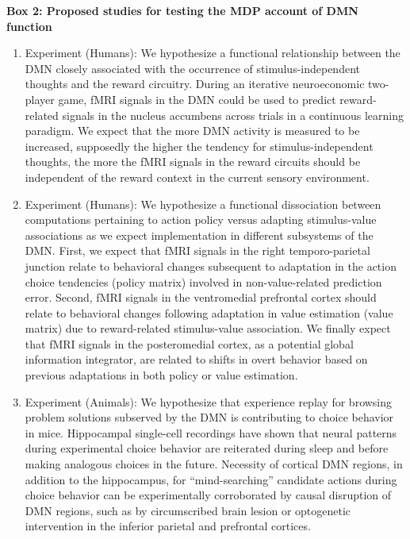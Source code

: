 \documentclass[10pt,letterpaper]{article}
\begin{document}
\begin{mdframed}
  \vspace{1em}
  \textbf{Box 2: Proposed studies for testing the MDP account of DMN function}
\begin{enumerate}
\item Experiment (Humans): We hypothesize a functional relationship between the DMN closely associated with the occurrence of stimulus-independent thoughts and the reward circuitry. During an iterative neuroeconomic two-player game, fMRI signals in the DMN could be used to predict reward-related signals in the nucleus accumbens across trials in a continuous learning paradigm. We expect that the more DMN activity is measured to be increased, supposedly the higher the tendency for stimulus-independent thoughts, the more the fMRI signals in the reward circuits should be independent of the reward context in the current sensory environment.

\item Experiment (Humans): We hypothesize a functional dissociation between computations pertaining to action policy versus adapting stimulus-value associations as we expect implementation in different subsystems of the DMN. First, we expect that fMRI signals in the right temporo-parietal junction relate to behavioral changes subsequent to adaptation in the action choice tendencies (policy matrix) involved in non-value-related prediction error. Second, fMRI signals in the ventromedial prefrontal cortex should relate to behavioral changes following adaptation in value estimation (value matrix) due to reward-related stimulus-value association. We finally expect that fMRI signals in the posteromedial cortex, as a potential global information integrator, are related to shifts in overt behavior based on previous adaptations in both policy or value estimation.

\item Experiment (Animals): We hypothesize that experience replay for browsing problem solutions subserved by the DMN is contributing to choice behavior in mice. Hippocampal single-cell recordings have shown that neural patterns during experimental choice behavior are reiterated during sleep and before making analogous choices in the future. Necessity of cortical DMN regions, in addition to the hippocampus, for “mind-searching” candidate actions during choice behavior can be experimentally corroborated by causal disruption of DMN regions, such as by circumscribed brain lesion or optogenetic intervention in the inferior parietal and prefrontal cortices.


\end{enumerate}
\end{mdframed}
\end{document}
